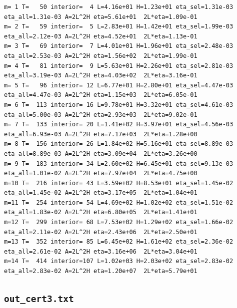 \documentclass[11pt,reqno]{amsart}
\numberwithin{equation}{section}
\theoremstyle{plain}
\theoremstyle{definition}
\theoremstyle{remark}
\begin{document}
\begin{lstlisting}[style=out]
m= 1 T=   50 interior=  4 L=4.16e+01 H=1.23e+01 eta_sel=1.31e-03 eta_all=1.31e-03 A=2L^2H eta=5.61e+01  2L*eta=1.09e-01
m= 2 T=   59 interior=  5 L=2.83e+01 H=1.42e+01 eta_sel=1.99e-03 eta_all=2.12e-03 A=2L^2H eta=4.52e+01  2L*eta=1.13e-01
m= 3 T=   69 interior=  7 L=4.01e+01 H=1.96e+01 eta_sel=2.48e-03 eta_all=2.53e-03 A=2L^2H eta=1.56e+02  2L*eta=1.99e-01
m= 4 T=   81 interior=  9 L=5.63e+01 H=2.26e+01 eta_sel=2.81e-03 eta_all=3.19e-03 A=2L^2H eta=4.03e+02  2L*eta=3.16e-01
m= 5 T=   96 interior= 12 L=6.77e+01 H=2.80e+01 eta_sel=4.47e-03 eta_all=4.47e-03 A=2L^2H eta=1.15e+03  2L*eta=6.05e-01
m= 6 T=  113 interior= 16 L=9.78e+01 H=3.32e+01 eta_sel=4.61e-03 eta_all=5.00e-03 A=2L^2H eta=2.93e+03  2L*eta=9.02e-01
m= 7 T=  133 interior= 20 L=1.41e+02 H=3.97e+01 eta_sel=4.56e-03 eta_all=6.93e-03 A=2L^2H eta=7.17e+03  2L*eta=1.28e+00
m= 8 T=  156 interior= 26 L=1.84e+02 H=5.16e+01 eta_sel=8.89e-03 eta_all=8.89e-03 A=2L^2H eta=3.09e+04  2L*eta=3.26e+00
m= 9 T=  183 interior= 34 L=2.60e+02 H=6.45e+01 eta_sel=9.13e-03 eta_all=1.01e-02 A=2L^2H eta=7.97e+04  2L*eta=4.75e+00
m=10 T=  216 interior= 43 L=3.59e+02 H=8.53e+01 eta_sel=1.45e-02 eta_all=1.45e-02 A=2L^2H eta=3.17e+05  2L*eta=1.04e+01
m=11 T=  254 interior= 54 L=4.69e+02 H=1.02e+02 eta_sel=1.51e-02 eta_all=1.83e-02 A=2L^2H eta=6.80e+05  2L*eta=1.41e+01
m=12 T=  299 interior= 68 L=7.53e+02 H=1.29e+02 eta_sel=1.66e-02 eta_all=2.11e-02 A=2L^2H eta=2.43e+06  2L*eta=2.50e+01
m=13 T=  352 interior= 85 L=6.45e+02 H=1.61e+02 eta_sel=2.36e-02 eta_all=2.61e-02 A=2L^2H eta=3.16e+06  2L*eta=3.04e+01
m=14 T=  414 interior=107 L=1.02e+03 H=2.03e+02 eta_sel=2.83e-02 eta_all=2.83e-02 A=2L^2H eta=1.20e+07  2L*eta=5.79e+01
\end{lstlisting}

\subsection{\texttt{out\_cert3.txt}}
\label{app:out-routeB-cert3}
\end{document}

